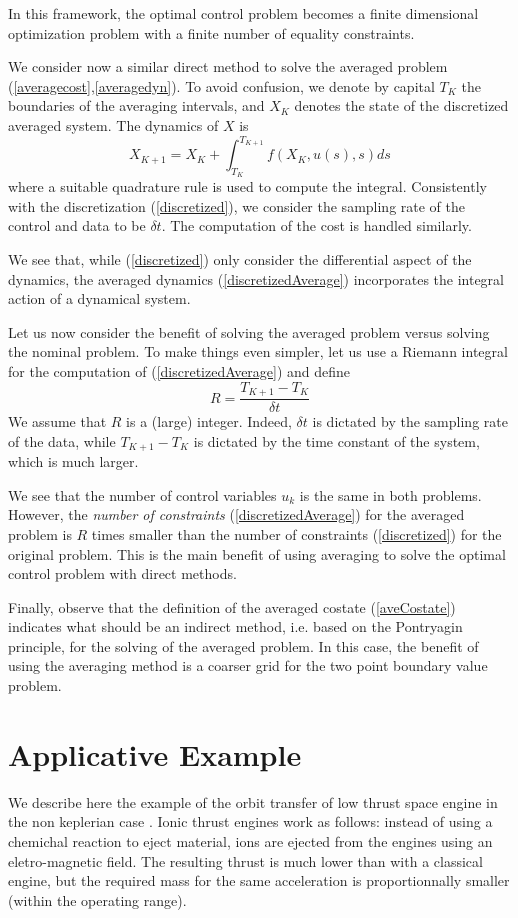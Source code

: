 \documentclass[a4paper,10pt]{article}
\begin{document}
In this framework, the optimal control problem becomes a finite 
dimensional optimization problem with a finite number of equality 
constraints.

We consider now a similar direct method to solve the averaged problem (\ref{averagecost},\ref{averagedyn}).
To avoid confusion, we denote by  capital $T_{K}$ the boundaries of 
the averaging intervals, and $X_{K}$ denotes the state of the 
discretized averaged system. The dynamics of $X$ is
\begin{equation}
	X_{K+1}=X_{K}+\int_{T_{K}}^{T_{K+1}}f(X_{K},u(s),s)ds
	\label{discretizedAverage}
\end{equation}
where a suitable quadrature rule is used to compute the integral. 
Consistently with the discretization (\ref{discretized}), we consider 
the sampling rate of the control and data to be $\delta t$. The 
computation of the cost is handled similarly.

We see that, while (\ref{discretized}) only consider the differential 
aspect of the dynamics, the averaged dynamics 
(\ref{discretizedAverage}) incorporates the integral action of a 
dynamical system.

Let us now consider the benefit of solving the averaged problem versus 
solving the nominal problem. To make things even simpler, let us use 
a Riemann integral for the computation of (\ref{discretizedAverage}) 
and define
\[
R=\frac{T_{K+1}-T_{K}}{\delta t}
\]
We assume that $R$ is a (large) integer. Indeed, $\delta t$ is 
dictated by the sampling rate of the data, while $T_{K+1}-T_{K}$ is 
dictated by the time constant of the system, which is much larger.

We see that the number of control variables $u_{k}$ is the same in 
both problems. However, the \emph{number of constraints} 
(\ref{discretizedAverage}) for the averaged problem is $R$ times smaller than the number of 
constraints (\ref{discretized}) for the original problem. This is the 
main benefit of using averaging to solve the optimal control problem 
with direct methods.

Finally, observe that the definition of the averaged costate 
(\ref{aveCostate}) indicates what should be an indirect method, i.e. 
based on the Pontryagin principle, for the solving of the averaged problem. 
In this case, the benefit 
of using the averaging method is a coarser grid for the two point 
boundary value problem.
\section{Applicative Example}\label{Example}
We describe here the example of the orbit 
transfer of low thrust space engine in the non keplerian case 
\cite{goumri}. Ionic thrust engines work as follows: instead of 
using a chemichal reaction to eject material, ions are ejected from 
the engines using an eletro-magnetic field. The resulting thrust is 
much lower than with a classical engine, but the required mass for 
the same acceleration is proportionnally smaller (within the 
operating range).
\end{document}
